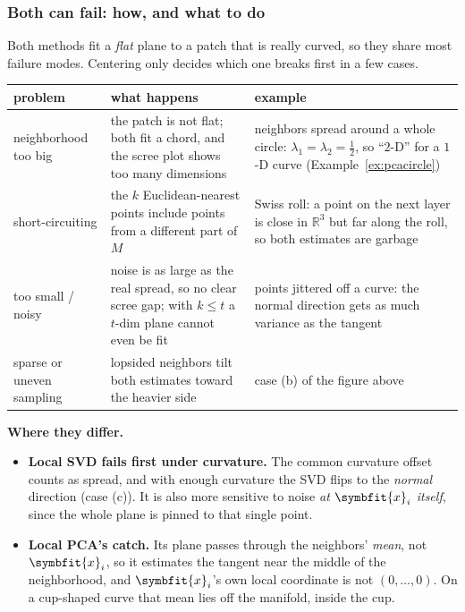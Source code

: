\documentclass[11pt]{article}
\newcommand{\bm}[1]{\symbfit{#1}}
\newcommand{\R}{\mathbb{R}}
\newcommand{\vx}{\bm{x}}
\begin{document}
\subsubsection*{Both can fail: how, and what to do}

Both methods fit a \emph{flat} plane to a patch that is really curved, so they share most failure modes. Centering only
decides which one breaks first in a few cases.

\begin{center}
\renewcommand{\arraystretch}{1.35}
\small
\begin{tabular}{@{}>{\raggedright\arraybackslash}p{2.7cm}>{\raggedright\arraybackslash}p{5.4cm}>{\raggedright\arraybackslash}p{5.6cm}@{}}
\toprule
problem & what happens & example \\
\midrule
neighborhood too big & the patch is not flat; both fit a chord, and the scree plot shows too many dimensions & neighbors spread around a whole circle: $\lambda_1=\lambda_2=\tfrac12$, so ``$2$-D'' for a $1$-D curve (Example~\ref{ex:pcacircle}) \\
short-circuiting & the $k$ Euclidean-nearest points include points from a different part of $M$ & Swiss roll: a point on the next layer is close in $\R^3$ but far along the roll, so both estimates are garbage \\
too small / noisy & noise is as large as the real spread, so no clear scree gap; with $k\le t$ a $t$-dim plane cannot even be fit & points jittered off a curve: the normal direction gets as much variance as the tangent \\
sparse or uneven sampling & lopsided neighbors tilt both estimates toward the heavier side & case (b) of the figure above \\
\bottomrule
\end{tabular}
\end{center}

\textbf{Where they differ.}
\begin{itemize}[nosep]
\item \textbf{Local SVD fails first under curvature.} The common curvature offset counts as spread, and with enough
curvature the SVD flips to the \emph{normal} direction (case (c)). It is also more sensitive to noise \emph{at $\vx_i$ itself}, since
the whole plane is pinned to that single point.
\item \textbf{Local PCA's catch.} Its plane passes through the neighbors' \emph{mean}, not $\vx_i$, so it estimates the tangent near the
middle of the neighborhood, and $\vx_i$'s own local coordinate is not $(0,\dots,0)$. On a cup-shaped curve that mean lies off the manifold,
inside the cup.
\end{itemize}
\end{document}
